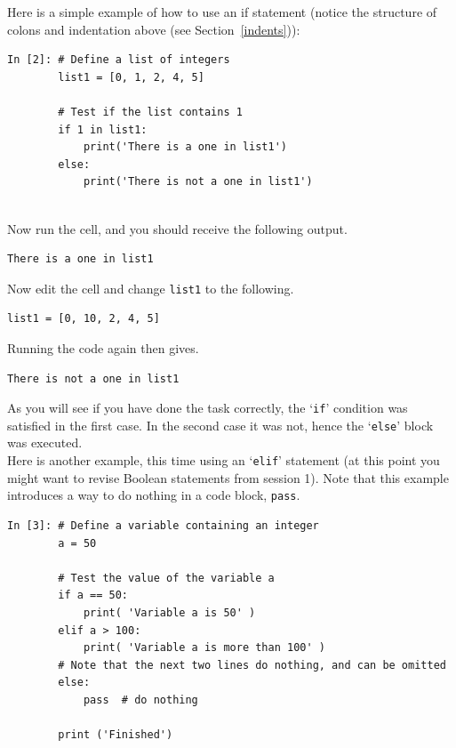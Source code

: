 \noindent Here is a simple example of how to use an if statement (notice the structure of colons and indentation above (see Section~\ref{indents})): 
\begin{lstlisting}[style=PY]
In [2]: # Define a list of integers
        list1 = [0, 1, 2, 4, 5]
    
        # Test if the list contains 1 
        if 1 in list1:
            print('There is a one in list1')
        else:
            print('There is not a one in list1')
	    
\end{lstlisting}

\noindent Now run the cell, and you should receive the following output. 
\begin{lstlisting}[style=PY_out]
        There is a one in list1
\end{lstlisting}  
\noindent Now edit the cell and change \texttt{list1} to the following.
\begin{lstlisting}[style=PY]
        list1 = [0, 10, 2, 4, 5]
\end{lstlisting}
Running the code again then gives.
\begin{lstlisting}[style=PY_out]
        There is not a one in list1
\end{lstlisting}  
As you will see if you have done the task correctly, the `{\tt if}' condition was satisfied in the first case. In the second case it was not, hence the `{\tt else}' block was executed.\\

\noindent Here is another example, this time using an `{\tt elif}' statement (at this point you might want to revise Boolean statements from session 1). Note that this example introduces a way to do nothing in a code block, \texttt{\color{mygreen}pass}.
\begin{lstlisting}[style=PY, escapechar=\%] 
In [3]: # Define a variable containing an integer 
        a = 50
        
        # Test the value of the variable a
        if a == 50:
            print( 'Variable a is 50' )
        elif a > 100:
            print( 'Variable a is more than 100' )
        # Note that the next two lines do nothing, and can be omitted
        else:
            pass  # do nothing

        print ('Finished')
\end{lstlisting}


